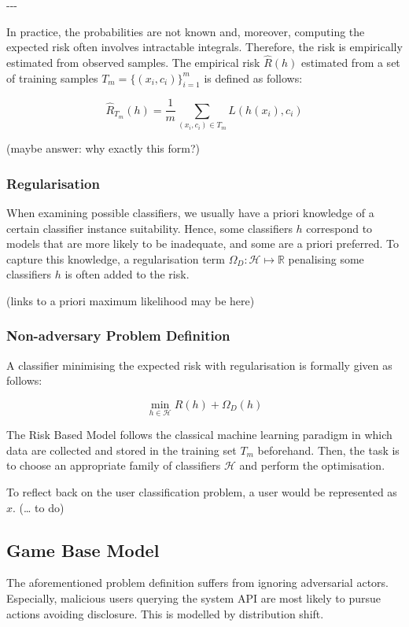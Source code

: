 \documentclass[10pt]{article}
\begin{document}
-\/-\/-

In practice, the probabilities are not known and, moreover, computing
the expected risk often involves intractable integrals. Therefore, the
risk is empirically estimated from observed samples. The empirical risk
\(\hat{R}(h)\) estimated from a set of training samples
\(T_m = \{ (x_i, c_i) \}_{i=1}^{m}\) is defined as follows:

\[
\hat{R}_{T_m}(h) = \frac{1}{m} \sum_{(x_i, c_i) \in T_m} L(h(x_i), c_i)
\]

(maybe answer: why exactly this form?)

\subsubsection{Regularisation}

When examining possible classifiers, we usually have a priori knowledge
of a certain classifier instance suitability. Hence, some classifiers
\(h\) correspond to models that are more likely to be inadequate, and
some are a priori preferred. To capture this knowledge, a regularisation
term \(\Omega_D: \mathcal{H} \mapsto \mathbb{R}\) penalising some
classifiers \(h\) is often added to the risk.

(links to a priori maximum likelihood may be here)

\subsubsection{Non-adversary Problem Definition}

A classifier minimising the expected risk with regularisation is
formally given as follows:

\[
\min_{h \in \mathcal{H}} R(h) + \Omega_D(h)
\]

The Risk Based Model follows the classical machine learning paradigm in
which data are collected and stored in the training set \(T_m\)
beforehand. Then, the task is to choose an appropriate family of
classifiers \(\mathcal{H}\) and perform the optimisation.

To reflect back on the user classification problem, a user would be
represented as \(x\). (\ldots{} to do)

\subsection{Game Base Model}

The aforementioned problem definition suffers from ignoring adversarial
actors. Especially, malicious users querying the system API are most
likely to pursue actions avoiding disclosure. This is modelled by
distribution shift.
\end{document}
